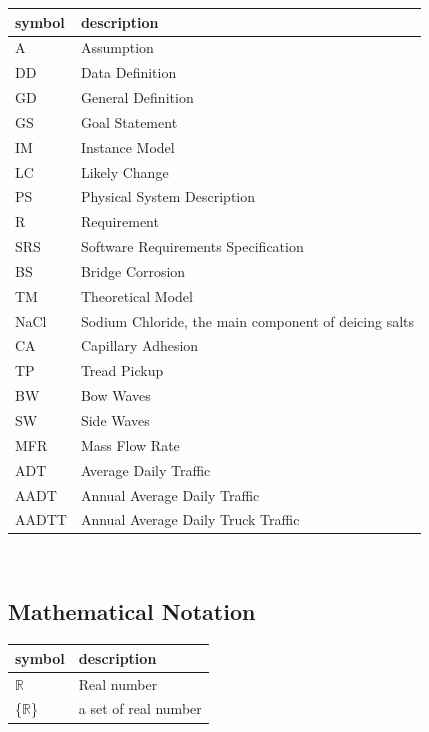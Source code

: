 \documentclass[12pt]{article}
\begin{document}
\renewcommand{\arraystretch}{1.2}
\begin{tabular}{l l} 
  \toprule		
  \textbf{symbol} & \textbf{description}\\
  \midrule 
  A & Assumption\\
  DD & Data Definition\\
  GD & General Definition\\
  GS & Goal Statement\\
  IM & Instance Model\\
  LC & Likely Change\\
  PS & Physical System Description\\
  R & Requirement\\
  SRS & Software Requirements Specification\\
  BS & Bridge Corrosion\\
  TM & Theoretical Model\\
  NaCl & Sodium Chloride, the main component of deicing salts \\
  CA & Capillary Adhesion \\
  TP & Tread Pickup\\
  BW & Bow Waves\\
  SW & Side Waves\\
  MFR & Mass Flow Rate\\
  ADT & Average Daily Traffic\\
  AADT & Annual Average Daily Traffic\\
  AADTT & Annual Average Daily Truck Traffic \\
  \bottomrule
\end{tabular}\\


\subsection{Mathematical Notation}
\renewcommand{\arraystretch}{1.2}
\begin{tabular}{l l} 
  \toprule		
  \textbf{symbol} & \textbf{description}\\
  \midrule 
  $\mathbb{R}$ & Real number \\
  \{$\mathbb{R}$\} & a set of real number\\
  \bottomrule
\end{tabular}\\

\end{document}
